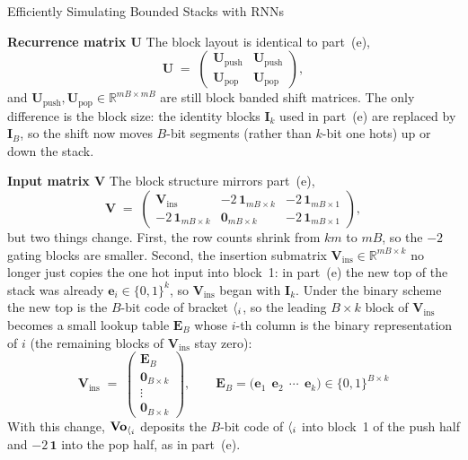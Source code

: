\begin{question}{Efficiently Simulating Bounded Stacks with RNNs}
\begin{subquestion}
    \textbf{Recurrence matrix $\mathbf{U}$} The block layout is identical to part~(e),
    \[
        \mathbf{U} \;=\; \begin{pmatrix} \mathbf{U}_{\text{push}} & \mathbf{U}_{\text{push}} \\ \mathbf{U}_{\text{pop}} & \mathbf{U}_{\text{pop}} \end{pmatrix},
    \]
    and $\mathbf{U}_{\text{push}}, \mathbf{U}_{\text{pop}} \in \mathbb{R}^{mB \times mB}$ are still block banded shift matrices. 
    The only difference is the block size: the identity blocks $\mathbf{I}_k$ used in part~(e) are replaced by $\mathbf{I}_B$, so the shift now moves $B$-bit segments (rather than $k$-bit one hots) up or down the stack.

    \textbf{Input matrix $\mathbf{V}$} The block structure mirrors part~(e),
    \[
        \mathbf{V} \;=\;
        \begin{pmatrix}
            \mathbf{V}_{\text{ins}} & -2\,\mathbf{1}_{mB \times k} & -2\,\mathbf{1}_{mB \times 1} \\[2pt]
            -2\,\mathbf{1}_{mB \times k} & \mathbf{0}_{mB \times k} & -2\,\mathbf{1}_{mB \times 1}
        \end{pmatrix},
    \]
    but two things change. First, the row counts shrink from $km$ to $mB$, so the $-2$ gating blocks are smaller. 
    Second, the insertion submatrix $\mathbf{V}_{\text{ins}} \in \mathbb{R}^{mB \times k}$ no longer just copies the one hot input into block~1: in part~(e) the new top of the stack was already $\mathbf{e}_i \in \{0,1\}^k$, so $\mathbf{V}_{\text{ins}}$ began with $\mathbf{I}_k$. 
    Under the binary scheme the new top is the $B$-bit code of bracket $\openBr{i}$, so the leading $B \times k$ block of $\mathbf{V}_{\text{ins}}$ becomes a small lookup table $\mathbf{E}_B$ whose $i$-th column is the binary representation of $i$ (the remaining blocks of $\mathbf{V}_{\text{ins}}$ stay zero):
    \[
        \mathbf{V}_{\text{ins}} \;=\; \begin{pmatrix} \mathbf{E}_B \\ \mathbf{0}_{B \times k} \\ \vdots \\ \mathbf{0}_{B \times k} \end{pmatrix},
        \qquad
        \mathbf{E}_B = \big(\mathbf{e}_1 \;\, \mathbf{e}_2 \;\, \cdots \;\, \mathbf{e}_k\big) \in \{0, 1\}^{B \times k}
    \]
    With this change, $\mathbf{V}\mathbf{o}_{\openBr{i}}$ deposits the $B$-bit code of $\openBr{i}$ into block~1 of the push half and $-2\,\mathbf{1}$ into the pop half, as in part~(e).


\end{subquestion}
\end{question}
